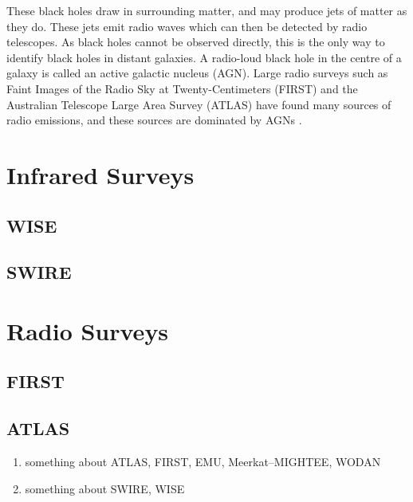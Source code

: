         These black holes draw in surrounding matter, and may produce jets of matter as they do. These jets emit radio waves  which can then be detected by radio telescopes. As black holes cannot be observed directly, this is the only way to identify black holes in distant galaxies. A radio-loud black hole in the centre of a galaxy is called an active galactic nucleus (AGN).  Large radio surveys such as Faint Images of the Radio Sky at Twenty-Centimeters (FIRST) \citep{white97, becker95} and the Australian Telescope Large Area Survey (ATLAS) \citep{franzen15} have found many sources of radio emissions, and these sources are dominated by AGNs \citep{banfield15}.

    \section{Infrared Surveys}

        \subsection{WISE}

        \subsection{SWIRE}

    \section{Radio Surveys}

        \subsection{FIRST}

        \subsection{ATLAS}

    \begin{enumerate}
        \item something about ATLAS, FIRST, EMU, Meerkat--MIGHTEE, WODAN
        \item something about SWIRE, WISE
    \end{enumerate}
